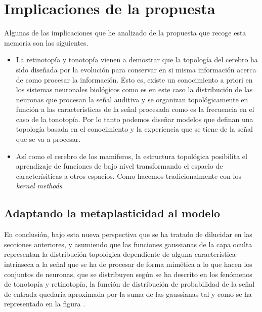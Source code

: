 \documentclass[10pt,a4paper]{report}
\begin{document}
\section{Implicaciones de la propuesta}
Algunas de las implicaciones que he analizado de la propuesta que recoge esta memoria son las siguientes.
\begin{itemize}
	\item La retinotopía y tonotopía vienen a demostrar que la topología del cerebro ha sido diseñada por la evolución para conservar en si misma información acerca de como procesar la información. Esto es, existe un conocimiento a priori en los sistemas neuronales biológicos como es en este caso la distribución de las neuronas que procesan la señal auditiva y se organizan topológicamente en función a las características de la señal procesada como es la frecuencia en el caso de la tonotopía. Por lo tanto podemos diseñar modelos que definan una topología basada en el conocimiento y la experiencia que se tiene de la señal que se va a procesar.
	\item Así como el cerebro de los mamiferos, la estructura topológica posibilita el aprendizaje de funciones de bajo nivel transformando el espacio de caracterísiticas a otros espacios. Como hacemos tradicionalmente con los \textit{kernel methods}.
\end{itemize}

\subsection{Adaptando la metaplasticidad al modelo}
En conclusión, bajo esta nueva perspectiva que se ha tratado de dilucidar en las secciones anteriores, y asumiendo que las funciones gaussianas de la capa oculta representan la distribución topológica dependiente de alguna característica intrínseca a la señal que se ha de procesar de forma mimética a lo que hacen los conjuntos de neuronas, que se distribuyen según se ha descrito en los fenómenos de tonotopía y retinotopía, la función de distribución de probabilidad de la señal de entrada quedaría aproximada por la suma de las gaussianas tal y como se ha representado en la figura . 
\end{document}
